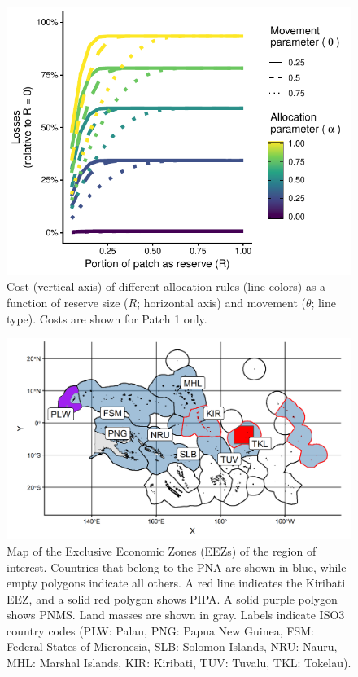 \documentclass[12pt]{article}
\begin{document}
\begin{figure}[htbp]
\centering
\includegraphics{img/allocation_cost_plot.pdf}
\caption{\label{fig:allocation_cost_plot}Cost (vertical axis) of different allocation rules (line colors) as a function of reserve  size ($R$; horizontal axis) and movement ($\theta$; line type). Costs are shown for Patch 1 only.}
\end{figure}

\begin{figure}
\centering
\includegraphics{img/PNA_map.png}
\caption{\label{fig:PNA_map}Map of the Exclusive Economic Zones (EEZs) of the region of interest. Countries that belong to the PNA are shown in blue, while empty polygons indicate all others. A red line indicates the Kiribati EEZ, and a solid red polygon shows PIPA. A solid purple polygon shows PNMS. Land masses are shown in gray. Labels indicate ISO3 country codes (PLW: Palau, PNG: Papua New Guinea, FSM: Federal States of Micronesia, SLB: Solomon Islands, NRU: Nauru, MHL: Marshal Islands, KIR: Kiribati, TUV: Tuvalu, TKL: Tokelau).}
\end{figure}
\end{document}
